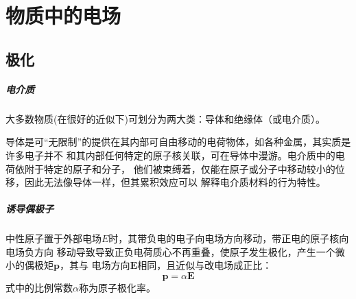 \chapter{物质中的电场}

\section{极化}

\paragraph*{电介质}
大多数物质(在很好的近似下)可划分为两大类：导体和绝缘体（或电介质）。

导体是可“无限制”的提供在其内部可自由移动的电荷物体，如各种金属，其实质是许多电子并不
和其内部任何特定的原子核关联，可在导体中漫游。电介质中的电荷依附于特定的原子和分子，
他们被束缚着，仅能在原子或分子中移动较小的位移，因此无法像导体一样，但其累积效应可以
解释电介质材料的行为特性。

\paragraph*{诱导偶极子}
中性原子置于外部电场$E$时，其带负电的电子向电场方向移动，带正电的原子核向电场负方向
移动导致导致正负电荷质心不再重叠，使原子发生极化，产生一个微小的偶极矩$\bm{p}$，其与
电场方向$\bm{E}$相同，且近似与改电场成正比：
\begin{equation}
    \bm{p} = \alpha \bm{E}
    \label{eq:charge-polorize}
\end{equation}
式中的比例常数$\alpha$称为原子极化率。
